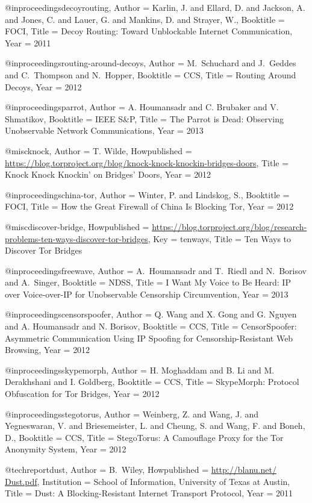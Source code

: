 {{{{{{{{{@inproceedings{decoyrouting,
	Author = {Karlin, J. and Ellard, D. and Jackson, A. and Jones, C. and Lauer, G. and Mankins, D. and Strayer, W.},
	Booktitle = {{FOCI}},
	Title = {{Decoy Routing: Toward Unblockable Internet Communication}},
	Year = {2011}}

@inproceedings{routing-around-decoys,
	Author = {M.~Schuchard and J.~Geddes and C.~Thompson and N.~Hopper},
	Booktitle = {{CCS}},
	Title = {{Routing Around Decoys}},
	Year = {2012}}

@inproceedings{parrot,
	Author = {A. Houmansadr and C. Brubaker and V. Shmatikov},
	Booktitle = {IEEE S\&P},
	Title = {{The Parrot is Dead: Observing Unobservable Network Communications}},
	Year = {2013}}

@misc{knock,
	Author = {T. Wilde},
	Howpublished = {\url{https://blog.torproject.org/blog/knock-knock-knockin-bridges-doors}},
	Title = {{Knock Knock Knockin' on Bridges' Doors}},
	Year = {2012}}

@inproceedings{china-tor,
	Author = {Winter, P. and Lindskog, S.},
	Booktitle = {{FOCI}},
	Title = {{How the Great Firewall of China Is Blocking Tor}},
	Year = {2012}}

@misc{discover-bridge,
	Howpublished = {\url{https://blog.torproject.org/blog/research-problems-ten-ways-discover-tor-bridges}},
	Key = {tenways},
	Title = {{Ten Ways to Discover Tor Bridges}}}

@inproceedings{freewave,
	Author = {A.~Houmansadr and T.~Riedl and N.~Borisov and A.~Singer},
	Booktitle = {{NDSS}},
	Title = {{I Want My Voice to Be Heard: IP over Voice-over-IP for Unobservable Censorship Circumvention}},
	Year = 2013}

@inproceedings{censorspoofer,
	Author = {Q. Wang and X. Gong and G. Nguyen and A. Houmansadr and N. Borisov},
	Booktitle = {CCS},
	Title = {{CensorSpoofer: Asymmetric Communication Using IP Spoofing for Censorship-Resistant Web Browsing}},
	Year = {2012}}

@inproceedings{skypemorph,
	Author = {H. Moghaddam and B. Li and M. Derakhshani and I. Goldberg},
	Booktitle = {CCS},
	Title = {{SkypeMorph: Protocol Obfuscation for Tor Bridges}},
	Year = {2012}}

@inproceedings{stegotorus,
	Author = {Weinberg, Z. and Wang, J. and Yegneswaran, V. and Briesemeister, L. and Cheung, S. and Wang, F. and Boneh, D.},
	Booktitle = {CCS},
	Title = {{StegoTorus: A Camouflage Proxy for the Tor Anonymity System}},
	Year = {2012}}

@techreport{dust,
	Author = {{B.~Wiley}},
	Howpublished = {\url{http://blanu.net/ Dust.pdf}},
	Institution = {School of Information, University of Texas at Austin},
	Title = {{Dust: A Blocking-Resistant Internet Transport Protocol}},
	Year = {2011}}

}}}}}}}}}
